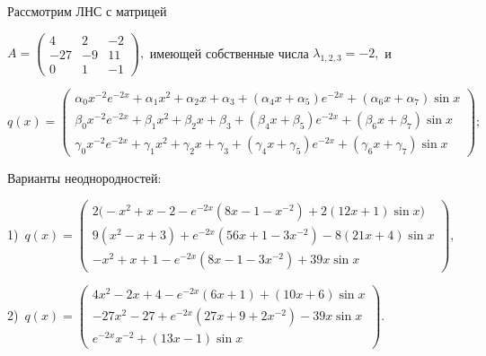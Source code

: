 \documentclass[11pt]{article}
\begin{document}
\medskip
Рассмотрим ЛНС с матрицей

\smallskip %
$A=\begin{pmatrix} 4&2&-2\\ -27&-9&11\\ 0&1&-1 \end{pmatrix},$ имеющей собственные числа $\lambda_{1,2,3}=-2,$ и %

\smallskip %
$q(x) =  \begin{pmatrix}
\alpha_0 x^{-2}e^{-2x} + \alpha_1 x^2 + \alpha_2 x + \alpha_3 + (\alpha_4 x + \alpha_5)e^{-2x} + (\alpha_6 x + \alpha_7) \sin x \\
\beta_0  x^{-2}e^{-2x} + \beta_1 x^2 + \beta_2 x  + \beta_3 +   (\beta_4 x + \beta_5)e^{-2x}   + (\beta_6 x + \beta_7) \sin x   \\
\gamma_0 x^{-2}e^{-2x} + \gamma_1 x^2 + \gamma_2 x + \gamma_3 + (\gamma_4 x + \gamma_5)e^{-2x} + (\gamma_6 x + \gamma_7) \sin x
\end{pmatrix};$

\smallskip %
Варианты неоднородностей:

1)\ $q(x) = \begin{pmatrix}
2\big(-x^{2} + x - 2 - e^{-2x}(8x - 1 - x^{-2}) + 2(12x+1)\sin x\big) \\
9(x^2 - x + 3) + e^{-2x}(56x + 1 - 3x^{-2}) - 8(21x+4)\sin x \\
-x^2 + x + 1 - e^{-2x}(8x - 1 - 3x^{-2}) + 39x\sin x
\end{pmatrix}, $

2)\ $q(x) = \begin{pmatrix}
4x^{2} - 2x + 4 - e^{-2x}(6x + 1) + (10x+6)\sin x \\
-27x^2 - 27 + e^{-2x}(27x + 9 + 2x^{-2}) - 39x \sin x\\
e^{-2x}x^{-2} + (13 x - 1) \sin x
\end{pmatrix}.$
\end{document}

